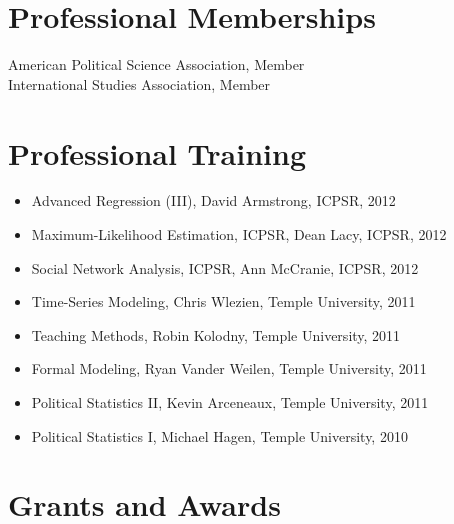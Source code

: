 \documentclass[margin, 12pt]{res} %
\begin{document}
\begin{resume}

\section{Professional Memberships} 

American Political Science Association, Member \vspace{3 mm} \\
International Studies Association, Member
 
\section{Professional Training}
\begin{itemize}
\item Advanced Regression (III), David Armstrong, ICPSR, 2012
\item Maximum-Likelihood Estimation, ICPSR, Dean Lacy, ICPSR, 2012
\item Social Network Analysis, ICPSR, Ann McCranie, ICPSR, 2012
\item Time-Series Modeling, Chris Wlezien, Temple University, 2011
\item Teaching Methods, Robin Kolodny, Temple University, 2011
\item Formal Modeling, Ryan Vander Weilen, Temple University, 2011
\item Political Statistics II, Kevin Arceneaux, Temple University, 2011
\item Political Statistics I, Michael Hagen, Temple University, 2010
\end{itemize}


\section{Grants and Awards} 


\end{resume}
\end{document}
